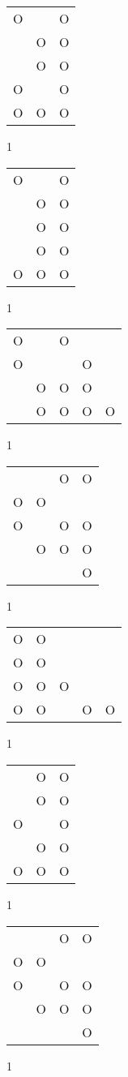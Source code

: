 \begin{tabular}{|m{0.2cm}m{0.2cm}m{0.2cm}|}\hline
O& &O\\
 &O&O\\
 &O&O\\
O& &O\\
O&O&O\\
\hline\end{tabular}1
\begin{tabular}{|m{0.2cm}m{0.2cm}m{0.2cm}|}\hline
O& &O\\
 &O&O\\
 &O&O\\
 &O&O\\
O&O&O\\
\hline\end{tabular}1
\begin{tabular}{|m{0.2cm}m{0.2cm}m{0.2cm}m{0.2cm}m{0.2cm}|}\hline
O& &O& & \\
O& & &O& \\
 &O&O&O& \\
 &O&O&O&O\\
\hline\end{tabular}1
\begin{tabular}{|m{0.2cm}m{0.2cm}m{0.2cm}m{0.2cm}|}\hline
 & &O&O\\
O&O& & \\
O& &O&O\\
 &O&O&O\\
 & & &O\\
\hline\end{tabular}1
\begin{tabular}{|m{0.2cm}m{0.2cm}m{0.2cm}m{0.2cm}m{0.2cm}|}\hline
O&O& & & \\
O&O& & & \\
O&O&O& & \\
O&O& &O&O\\
\hline\end{tabular}1
\begin{tabular}{|m{0.2cm}m{0.2cm}m{0.2cm}|}\hline
 &O&O\\
 &O&O\\
O& &O\\
 &O&O\\
O&O&O\\
\hline\end{tabular}1
\begin{tabular}{|m{0.2cm}m{0.2cm}m{0.2cm}m{0.2cm}|}\hline
 & &O&O\\
O&O& & \\
O& &O&O\\
 &O&O&O\\
 & & &O\\
\hline\end{tabular}1
